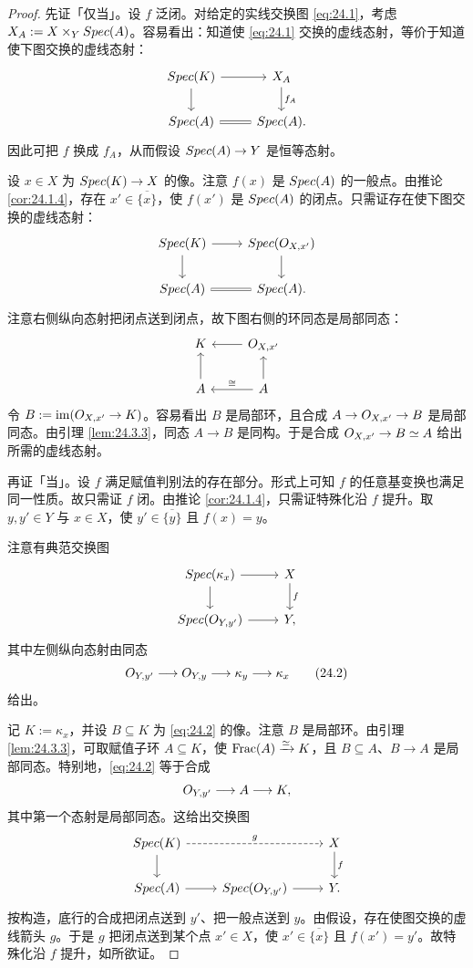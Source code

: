\begin{proof}
先证「仅当」。设 $f$ 泛闭。对给定的实线交换图 \eqref{eq:24.1}，考虑 $X_A := X \times_Y Spec(A)$。容易看出：知道使 \eqref{eq:24.1} 交换的虚线态射，等价于知道使下图交换的虚线态射：
\[
\begin{tikzcd}
\Spec(K) \arrow[r] \arrow[d] & X_A \arrow[d, "f_A"] \\
\Spec(A) \arrow[r, equal] & \Spec(A).
\end{tikzcd}
\]
因此可把 $f$ 换成 $f_A$，从而假设 $Spec(A) \to Y$ 是恒等态射。

设 $x \in X$ 为 $Spec(K) \to X$ 的像。注意 $f(x)$ 是 $Spec(A)$ 的一般点。由推论 \ref{cor:24.1.4}，存在 $x' \in \overline{\{x\}}$，使 $f(x')$ 是 $Spec(A)$ 的闭点。只需证存在使下图交换的虚线态射：
\[
\begin{tikzcd}
\Spec(K) \arrow[r] \arrow[d] & \Spec(\cO_{X,x'}) \arrow[d] \\
\Spec(A) \arrow[r, equal] & \Spec(A).
\end{tikzcd}
\]
注意右侧纵向态射把闭点送到闭点，故下图右侧的环同态是局部同态：
\[
\begin{tikzcd}
K & \cO_{X,x'} \arrow[l] \\
A \arrow[u] & A \arrow[u] \arrow[l, "\cong"']
\end{tikzcd}
\]
令 $B := \operatorname{im}(O_{X,x'} \to K)$。容易看出 $B$ 是局部环，且合成 $A \to O_{X,x'} \to B$ 是局部同态。由引理 \ref{lem:24.3.3}，同态 $A \to B$ 是同构。于是合成 $O_{X,x'} \to B \simeq A$ 给出所需的虚线态射。

再证「当」。设 $f$ 满足赋值判别法的存在部分。形式上可知 $f$ 的任意基变换也满足同一性质。故只需证 $f$ 闭。由推论 \ref{cor:24.1.4}，只需证特殊化沿 $f$ 提升。取 $y, y' \in Y$ 与 $x \in X$，使 $y' \in \overline{\{y\}}$ 且 $f(x) = y$。

注意有典范交换图
\[
\begin{tikzcd}
\Spec(\kappa_x) \arrow[r] \arrow[d] & X \arrow[d, "f"] \\
\Spec(\cO_{Y,y'}) \arrow[r] & Y,
\end{tikzcd}
\]
其中左侧纵向态射由同态
\[
O_{Y,y'} \longrightarrow O_{Y,y} \longrightarrow \kappa_y \longrightarrow \kappa_x \tag{24.2}\label{eq:24.2}
\]
给出。

记 $K := \kappa_x$，并设 $B \subseteq K$ 为 \eqref{eq:24.2} 的像。注意 $B$ 是局部环。由引理 \ref{lem:24.3.3}，可取赋值子环 $A \subseteq K$，使 $\operatorname{Frac}(A) \xrightarrow{\simeq} K$，且 $B \subseteq A$、$B \to A$ 是局部同态。特别地，\eqref{eq:24.2} 等于合成
\[
O_{Y,y'} \longrightarrow A \longrightarrow K,
\]
其中第一个态射是局部同态。这给出交换图
\[
\begin{tikzcd}
\Spec(K) \arrow[rr, dashed, "g"] \arrow[d] & & X \arrow[d, "f"] \\
\Spec(A) \arrow[r] & \Spec(\cO_{Y,y'}) \arrow[r] & Y.
\end{tikzcd}
\]
按构造，底行的合成把闭点送到 $y'$、把一般点送到 $y$。由假设，存在使图交换的虚线箭头 $g$。于是 $g$ 把闭点送到某个点 $x' \in X$，使 $x' \in \overline{\{x\}}$ 且 $f(x') = y'$。故特殊化沿 $f$ 提升，如所欲证。
\end{proof}

